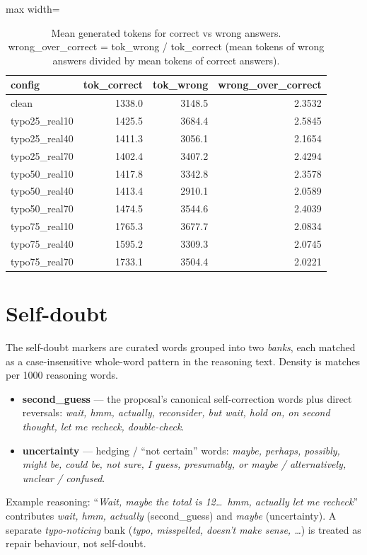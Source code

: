 \documentclass[11pt]{article}
\begin{document}
\begin{table}[H]
\centering
\caption{Mean generated tokens for correct vs wrong answers. wrong\_over\_correct = tok\_wrong / tok\_correct (mean tokens of wrong answers divided by mean tokens of correct answers).}
\small
\begin{adjustbox}{max width=\textwidth}
\begin{tabular}{lrrr}
\toprule
\textbf{config} & \textbf{tok\_correct} & \textbf{tok\_wrong} & \textbf{wrong\_over\_correct} \\
\midrule
clean & 1338.0 & 3148.5 & 2.3532 \\
typo25\_real10 & 1425.5 & 3684.4 & 2.5845 \\
typo25\_real40 & 1411.3 & 3056.1 & 2.1654 \\
typo25\_real70 & 1402.4 & 3407.2 & 2.4294 \\
typo50\_real10 & 1417.8 & 3342.8 & 2.3578 \\
typo50\_real40 & 1413.4 & 2910.1 & 2.0589 \\
typo50\_real70 & 1474.5 & 3544.6 & 2.4039 \\
typo75\_real10 & 1765.3 & 3677.7 & 2.0834 \\
typo75\_real40 & 1595.2 & 3309.3 & 2.0745 \\
typo75\_real70 & 1733.1 & 3504.4 & 2.0221 \\
\bottomrule
\end{tabular}
\end{adjustbox}
\end{table}

\section*{Self-doubt}
\noindent The self-doubt markers are curated words grouped into two
\emph{banks}, each matched as a case-insensitive whole-word pattern in the reasoning
text. Density is matches per 1000 reasoning words.
\begin{itemize}\setlength{\itemsep}{1pt}
  \item \textbf{second\_guess} --- the proposal's canonical self-correction words plus
  direct reversals: \emph{wait, hmm, actually, reconsider, but wait, hold on, on second
  thought, let me recheck, double-check}.
  \item \textbf{uncertainty} --- hedging / ``not certain'' words: \emph{maybe, perhaps,
  possibly, might be, could be, not sure, I guess, presumably, or maybe / alternatively,
  unclear / confused}.
\end{itemize}
\noindent Example reasoning: ``\emph{Wait, maybe the total is 12\dots\ hmm, actually let
me recheck}'' contributes \emph{wait, hmm, actually} (second\_guess) and \emph{maybe}
(uncertainty). A separate \emph{typo-noticing} bank (\emph{typo, misspelled, doesn't make
sense, \dots}) is treated as repair behaviour, not self-doubt.
\medskip
\end{document}
